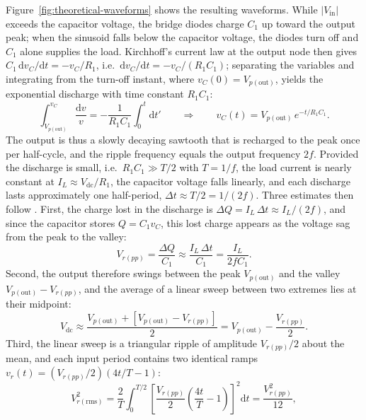 \documentclass[12pt,a4paper]{article}
\begin{document}
	Figure~\ref{fig:theoretical-waveforms} shows the resulting waveforms. While $|V_{\mathrm{in}}|$ exceeds the capacitor voltage, the bridge diodes charge $C_1$ up toward the output peak; when the sinusoid falls below the capacitor voltage, the diodes turn off and $C_1$ alone supplies the load. Kirchhoff's current law at the output node then gives $C_1\,\mathrm{d}v_C/\mathrm{d}t = -v_C/R_1$, i.e.\ $\mathrm{d}v_C/\mathrm{d}t = -v_C/(R_1C_1)$; separating the variables and integrating from the turn-off instant, where $v_C(0) = V_{p(\mathrm{out})}$, yields the exponential discharge with time constant $R_1C_1$:
	\begin{equation}
		\int_{V_{p(\mathrm{out})}}^{v_C}\frac{\mathrm{d}v}{v}
		= -\frac{1}{R_1C_1}\int_{0}^{t}\mathrm{d}t'
		\qquad\Longrightarrow\qquad
		v_{C}(t) = V_{p(\mathrm{out})}\, e^{-t/R_1C_1}.
		\label{eq:discharge}
	\end{equation}
	The output is thus a slowly decaying sawtooth that is recharged to the peak once per half-cycle, and the ripple frequency equals the output frequency $2f$. Provided the discharge is small, i.e.\ $R_1C_1 \gg T/2$ with $T = 1/f$, the load current is nearly constant at $I_L \approx V_{\mathrm{dc}}/R_1$, the capacitor voltage falls linearly, and each discharge lasts approximately one half-period, $\Delta t \approx T/2 = 1/(2f)$. Three estimates then follow \cite{ref:theraja-filter}. First, the charge lost in the discharge is $\Delta Q = I_L\,\Delta t \approx I_L/(2f)$, and since the capacitor stores $Q = C_1v_C$, this lost charge appears as the voltage sag from the peak to the valley:
	\begin{equation}
		V_{r(pp)} = \frac{\Delta Q}{C_1} \approx \frac{I_L\,\Delta t}{C_1} = \frac{I_L}{2fC_1}.
		\label{eq:ripple-pp}
	\end{equation}
	Second, the output therefore swings between the peak $V_{p(\mathrm{out})}$ and the valley $V_{p(\mathrm{out})}-V_{r(pp)}$, and the average of a linear sweep between two extremes lies at their midpoint:
	\begin{equation}
		V_{\mathrm{dc}} \approx \frac{V_{p(\mathrm{out})} + \left[V_{p(\mathrm{out})} - V_{r(pp)}\right]}{2} = V_{p(\mathrm{out})} - \frac{V_{r(pp)}}{2}.
		\label{eq:vdc-filter}
	\end{equation}
	Third, the linear sweep is a triangular ripple of amplitude $V_{r(pp)}/2$ about the mean, and each input period contains two identical ramps $v_r(t) = (V_{r(pp)}/2)(4t/T - 1)$:
	\begin{equation}
		V_{r(\mathrm{rms})}^{2} = \frac{2}{T}\int_{0}^{T/2}\left[\frac{V_{r(pp)}}{2}\left(\frac{4t}{T}-1\right)\right]^{2}\mathrm{d}t = \frac{V_{r(pp)}^{2}}{12},
		\label{eq:vrms-r}
	\end{equation}
\end{document}
